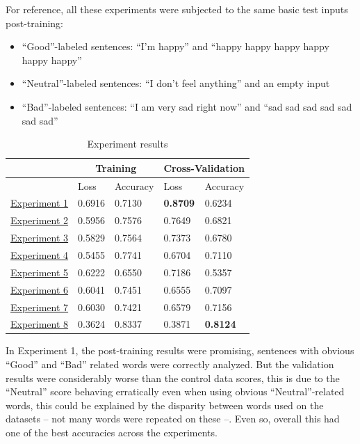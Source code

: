 \documentclass[review]{elsarticle} %
\begin{document}
For reference, all these experiments were subjected to the same basic test inputs post-training:
\begin{itemize}
	\item ``Good''-labeled sentences: ``I'm happy'' and ``happy happy happy happy happy happy''
	\item ``Neutral''-labeled sentences: ``I don't feel anything'' and an empty input
	\item ``Bad''-labeled sentences: ``I am very sad right now'' and ``sad sad sad sad sad sad sad''
\end{itemize}
\begin{table}[!h]
	\caption{Experiment results}
	\vspace{0.5cm}
	\centering
	\begin{tabular}[t]{|l|l|l|l|l|}
	\hline
	\multicolumn{1}{|c|}{} & \multicolumn{2}{c|}{Training} & \multicolumn{2}{c|}{Cross-Validation}
	\\ \hline
	\ & Loss & Accuracy & Loss & Accuracy
	\\ \hline
	\hyperref[exp1]{Experiment 1} & 0.6916 & 0.7130 & \textbf{0.8709} & 0.6234
	\\ \hline
	\hyperref[exp2]{Experiment 2} & 0.5956 & 0.7576 & 0.7649 & 0.6821
	\\ \hline
	\hyperref[exp3]{Experiment 3} & 0.5829 & 0.7564 & 0.7373 & 0.6780
	\\ \hline
	\hyperref[exp4]{Experiment 4} & 0.5455 & 0.7741 & 0.6704 & 0.7110
	\\ \hline
	\hyperref[exp6]{Experiment 5} & 0.6222 & 0.6550 & 0.7186 & 0.5357
	\\ \hline
	\hyperref[exp7]{Experiment 6} & 0.6041 & 0.7451 & 0.6555 & 0.7097
	\\ \hline
	\hyperref[exp8]{Experiment 7} & 0.6030 & 0.7421 & 0.6579 & 0.7156
	\\ \hline
	\hyperref[exp9]{Experiment 8} & 0.3624 & 0.8337 & 0.3871 & \textbf{0.8124}
	\\ \hline
	\end{tabular}
\end{table}
\pagebreak

In Experiment 1, the post-training results were promising, sentences with obvious ``Good'' and ``Bad'' related words were correctly analyzed. But the validation results were considerably worse than the control data scores, this is due to the ``Neutral'' score behaving erratically even when using obvious ``Neutral''-related words, this could be explained by the disparity between words used on the datasets -- not many words were repeated on these --. Even so, overall this had one of the best accuracies across the experiments.
\end{document}
